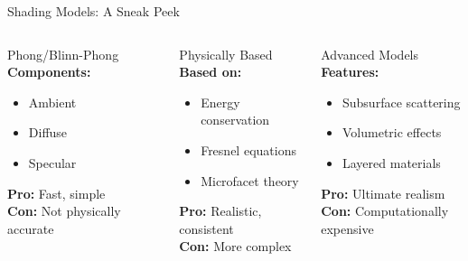 \begin{frame}{Shading Models: A Sneak Peek}
    \begin{columns}
        \begin{column}{0.33\textwidth}
            \begin{conceptbox}{Phong/Blinn-Phong}
                \textbf{Components:}
                \begin{itemize}
                    \item Ambient
                    \item Diffuse  
                    \item Specular
                \end{itemize}
                \textbf{Pro:} Fast, simple\\
                \textbf{Con:} Not physically accurate
            \end{conceptbox}
        \end{column}
        \begin{column}{0.33\textwidth}
            \begin{conceptbox}{Physically Based}
                \textbf{Based on:}
                \begin{itemize}
                    \item Energy conservation
                    \item Fresnel equations
                    \item Microfacet theory
                \end{itemize}
                \textbf{Pro:} Realistic, consistent\\
                \textbf{Con:} More complex
            \end{conceptbox}
        \end{column}
        \begin{column}{0.33\textwidth}
            \begin{conceptbox}{Advanced Models}
                \textbf{Features:}
                \begin{itemize}
                    \item Subsurface scattering
                    \item Volumetric effects
                    \item Layered materials
                \end{itemize}
                \textbf{Pro:} Ultimate realism\\
                \textbf{Con:} Computationally expensive
            \end{conceptbox}
        \end{column}
    \end{columns}
\end{frame}

